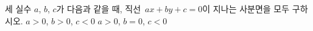 세 실수 $a$, $b$, $c$가 다음과 같을 때, 직선~$ax+by+c=0$이 지나는 사분면을 모두 구하시오.
 $a>0$, $b>0$, $c<0$
 $a>0$, $b=0$, $c<0$
